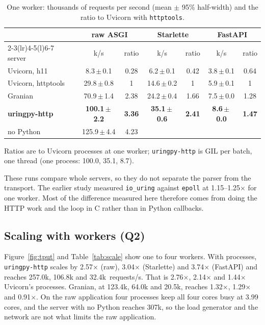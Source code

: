 \documentclass[10pt,twocolumn,letterpaper]{article}
\newcommand{\code}[1]{\texttt{#1}}
\newcommand{\kx}{$\times$}
\begin{document}
\begin{table}[t]
\caption{One worker: thousands of requests per second (mean $\pm$ 95\% half-width) and the ratio to Uvicorn with \code{httptools}.}
\label{tab:one}
\centering\footnotesize
\begin{tabular}{@{}lcccccc@{}}
\toprule
 & \multicolumn{2}{c}{raw ASGI} & \multicolumn{2}{c}{Starlette} & \multicolumn{2}{c}{FastAPI}\\
\cmidrule(lr){2-3}\cmidrule(lr){4-5}\cmidrule(l){6-7}
server & k/s & ratio & k/s & ratio & k/s & ratio\\
\midrule
Uvicorn, h11 & 8.3\,$\pm$\,0.1 & 0.28 & 6.2\,$\pm$\,0.1 & 0.42 & 3.8\,$\pm$\,0.1 & 0.64\\
Uvicorn, httptools & 29.8\,$\pm$\,0.8 & 1 & 14.6\,$\pm$\,0.2 & 1 & 5.9\,$\pm$\,0.1 & 1\\
Granian & 70.9\,$\pm$\,1.4 & 2.38 & 24.2\,$\pm$\,0.4 & 1.66 & 7.5\,$\pm$\,0.0 & 1.28\\
\textbf{uringpy-http} & \textbf{100.1\,$\pm$\,2.2} & \textbf{3.36} & \textbf{35.1\,$\pm$\,0.6} & \textbf{2.41} & \textbf{8.6\,$\pm$\,0.0} & \textbf{1.47}\\
\quad no Python & 125.9\,$\pm$\,4.4 & 4.23 & & & & \\
\bottomrule
\end{tabular}
\par\smallskip\raggedright\scriptsize Ratios are to Uvicorn processes at one worker; \code{uringpy-http} is GIL per batch, one thread (one process: 100.0, 35.1, 8.7).
\end{table}

These runs compare whole servers, so they do not separate the parser from
the transport. The earlier study measured \code{io\_uring} against
\code{epoll} at 1.15--1.25\kx{} for one worker. Most of the difference
measured here therefore comes from doing the HTTP work and the loop in C
rather than in Python callbacks.

\subsection{Scaling with workers (Q2)}

Figure~\ref{fig:tput} and Table~\ref{tab:scale} show one to four workers.
With processes, \code{uringpy-http} scales by 2.57\kx{} (raw), 3.04\kx{}
(Starlette) and 3.74\kx{} (FastAPI) and reaches 257.0k, 106.8k and
32.4k~requests/s. That is 2.76\kx{}, 2.14\kx{} and 1.44\kx{} Uvicorn's
processes. Granian, at 123.4k, 64.0k and 20.5k, reaches 1.32\kx{},
1.29\kx{} and 0.91\kx{}. On the raw application four processes keep all
four cores busy at 3.99 cores, and the server with no Python reaches 307k, so
the load generator and the network are not what limits the raw application.
\end{document}
